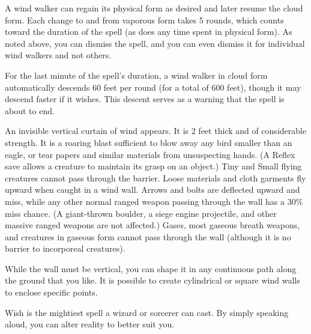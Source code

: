 \begin{multicols}{2}
\begin{small}
\smallskip\noindent A wind walker can regain its physical form as desired and later resume the cloud form. Each change to and from vaporous form takes 5 rounds, which counts toward the duration of the spell (as does any time spent in physical form). As noted above, you can dismiss the spell, and you can even dismiss it for individual wind walkers and not others.

\smallskip\noindent For the last minute of the spell's duration, a wind walker in cloud form automatically descends 60 feet per round (for a total of 600 feet), though it may descend faster if it wishes. This descent serves as a warning that the spell is about to end.

\noindent An invisible vertical curtain of wind appears. It is 2 feet thick and of considerable strength. It is a roaring blast sufficient to blow away any bird smaller than an eagle, or tear papers and similar materials from unsuspecting hands. (A Reflex save allows a creature to maintain its grasp on an object.) Tiny and Small flying creatures cannot pass through the barrier. Loose materials and cloth garments fly upward when caught in a wind wall. Arrows and bolts are deflected upward and miss, while any other normal ranged weapon passing through the wall has a 30\% miss chance. (A giant-thrown boulder, a siege engine projectile, and other massive ranged weapons are not affected.) Gases, most gaseous breath weapons, and creatures in gaseous form cannot pass through the wall (although it is no barrier to incorporeal creatures).

\smallskip\noindent While the wall must be vertical, you can shape it in any continuous path along the ground that you like. It is possible to create cylindrical or square wind walls to enclose specific points. 


\noindent Wish is the mightiest spell a wizard or sorcerer can cast. By simply speaking aloud, you can alter reality to better suit you.


\end{small}
\end{multicols}
